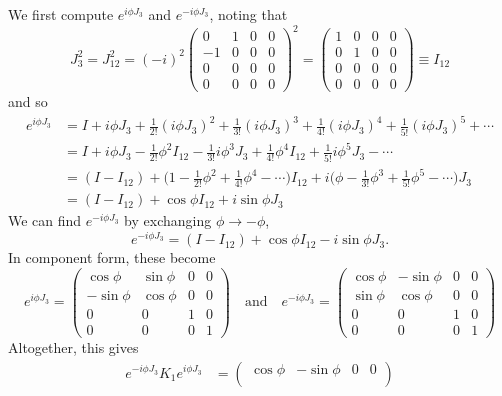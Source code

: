 \documentclass[../group-theory-in-a-nutshell-for-physicists.tex]{subfiles}
\begin{document}
\begin{questions}
\begin{solution}
	We first compute $e^{i\phi J_3}$ and $e^{-i\phi J_3}$, noting that
	\[
		J_3^2 = J_{12}^2 = (-i)^2\begin{pmatrix}0 & 1 & 0 & 0 \\ -1 & 0 & 0 & 0 \\ 0 & 0 & 0 & 0 \\ 0 & 0 & 0 & 0\end{pmatrix}^2 = \begin{pmatrix}1 & 0 & 0 & 0 \\ 0 & 1 & 0 & 0 \\ 0 & 0 & 0 & 0 \\ 0 & 0 & 0 & 0\end{pmatrix} \equiv I_{12}
	\]
	and so
	\begin{align*}
	e^{i\phi J_3} &= I + i\phi J_3 + \frac{1}{2!}(i\phi J_3)^2 + \frac{1}{3!}(i\phi J_3)^3 + \frac{1}{4!}(i\phi J_3)^4 + \frac{1}{5!}(i\phi J_3)^5 + \cdots \\
		&= I + i\phi J_3 - \frac{1}{2!}\phi^2I_{12} - \frac{1}{3!}i\phi^3J_3 + \frac{1}{4!}\phi^4I_{12} + \frac{1}{5!}i\phi^5J_3 - \cdots \\
		&= (I - I_{12}) + \Big(1 - \frac{1}{2!}\phi^2 + \frac{1}{4!}\phi^4 - \cdots\Big)I_{12} + i\Big(\phi - \frac{1}{3!}\phi^3 + \frac{1}{5!}\phi^5 - \cdots\Big)J_3 \\
		&= (I - I_{12}) + \cos\phi I_{12} + i\sin\phi J_3
	\end{align*}
	We can find $e^{-i\phi J_3}$ by exchanging $\phi \to -\phi$,
	\[
		e^{-i\phi J_3} = (I - I_{12}) + \cos\phi I_{12} - i\sin\phi J_3.
	\]
	In component form, these become
	\[
		e^{i\phi J_3} = \begin{pmatrix}
		\cos\phi & \sin\phi & 0 & 0 \\
		-\sin\phi & \cos\phi & 0 & 0 \\
		0 & 0 & 1 & 0 \\
		0 & 0 & 0 & 1
		\end{pmatrix} \quad \text{and} \quad e^{-i\phi J_3} = \begin{pmatrix}
		\cos\phi & -\sin\phi & 0 & 0 \\
		\sin\phi & \cos\phi & 0 & 0 \\
		0 & 0 & 1 & 0 \\
		0 & 0 & 0 & 1
		\end{pmatrix}
	\]
	Altogether, this gives
	\begin{align*}
		e^{-i\phi J_3}K_1e^{i\phi J_3} &= \begin{pmatrix}
		\cos\phi & -\sin\phi & 0 & 0 \\

\end{pmatrix}
\end{align*}
\end{solution}
\end{questions}
\end{document}
